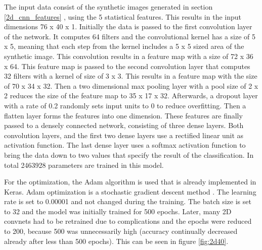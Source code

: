 The input data consist of the synthetic images generated in section \ref{2d_cnn_features} , using the 5 statistical features. This results in the input dimensions 76 x 40 x 1. Initially the data is passed to the first convolution layer of the network. It computes 64 filters and the convolutional kernel has a size of 5 x 5, meaning that each step from the kernel includes a 5 x 5 sized area of the synthetic image. This convolution results in a feature map with a size of 72 x 36 x 64. This feature map is passed to the second convolution layer that computes 32 filters with a kernel of size of 3 x 3. This results in a feature map with the size of 70 x 34 x 32. Then a two dimensional max pooling layer with a pool size of 2 x 2 reduces the size of the feature map to 35 x 17 x 32. Afterwards, a dropout layer with a rate of 0.2 randomly sets input units to 0 to reduce overfitting. Then a flatten layer forms the features into one dimension. These features are finally passed to a densely connected network, consisting of three dense layers. Both convolution layers, and the first two dense layers use a rectified linear unit as activation function. The last dense layer uses a softmax activation function to bring the data down to two values that specify the result of the classification. In total 2463928 parameters are trained in this model.

For the optimization, the Adam algorithm is used that is already implemented in Keras. Adam optimization is a stochastic gradient descent method \cite{keras}. The learning rate is set to 0.00001 and not changed during the training. The batch size is set to 32 and the model was initially trained for 500 epochs. Later, many 2D convnets had to be retrained due to complications and the epochs were reduced to 200, because 500 was unnecessarily high (accuracy continually decreased already after less than 500 epochs). This can be seen in figure \ref{fig:2d40}. 


